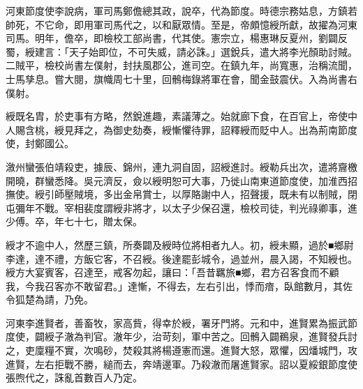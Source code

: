 \begin{pinyinscope}
 河東節度使李說病，軍司馬鄭儋總其政，說卒，代為節度。時德宗務姑息，方鎮若帥死，不它命，即用軍司馬代之，以和厭眾情。至是，帝頗憶綬所獻，故擢為河東司馬。明年，儋卒，即檢校工部尚書，代其使。憲宗立，楊惠琳反夏州，劉闢反蜀，綬建言：「天子始即位，不可失威，請必誅。」選銳兵，遣大將李光顏助討賊。二賊平，檢校尚書左僕射，封扶風郡公，進司空。在鎮九年，尚寬惠，治稱流聞，士馬孳息。嘗大閱，旗幟周七十里，回鶻梅錄將軍在會，聞金鼓震伏。入為尚書右僕射。



 綬既名胄，於吏事有方略，然銳進趣，素議薄之。始就廊下食，在百官上，帝使中人賜含桃，綬見拜之，為御史劾奏，綬慚懼待罪，詔釋綬而貶中人。出為荊南節度使，封鄭國公。



 漵州蠻張伯靖殺吏，據辰、錦州，連九洞自固，詔綬進討。綬勒兵出次，遣將齎檄開曉，群蠻悉降。吳元濟反，僉以綬明恕可大事，乃徙山南東道節度使，加淮西招撫使。綬引師壓賊境，多出金帛賞士，以厚賂謝中人，招聲援，既未有以制賊，閉屯彌年不戰。宰相裴度謂綬非將才，以太子少保召還，檢校司徒，判光祿卿事，進少傅。卒，年七十七，贈太保。



 綬才不逾中人，然歷三鎮，所奏闢及綬時位將相者九人。初，綬未顯，過於■鄉尉李達，達不禮，方飯它客，不召綬。後達罷彭城令，過並州，晨入謁，不知綬也。綬方大宴賓客，召達至，戒客勿起，讓曰：「吾昔羈旅■鄉，君方召客食而不顧我，今我召客亦不敢留君。」達慚，不得去，左右引出，悸而瘖，臥館數月，其佐令狐楚為請，乃免。



 河東李進賢者，善畜牧，家高貲，得幸於綬，署牙門將。元和中，進賢累為振武節度使，闢綬子澈為判官。澈年少，治苛刻，軍中苦之。回鶻入闢鵜泉，進賢發兵討之，吏廩糧不實，次鳴砂，焚殺其將楊遵憲而還。進賢大怒，眾懼，因燔城門，攻進賢，左右拒戰不勝，縋而去，奔靖邊軍。乃殺澈而屠進賢家。詔以夏綏銀節度使張煦代之，誅亂首數百人乃定。



\end{pinyinscope}